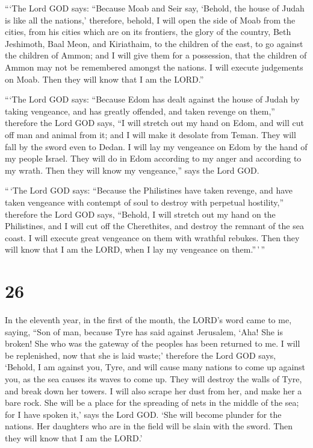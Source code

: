  ```The Lord GOD says: ``Because Moab and Seir say, `Behold,
the house of Judah is like all the nations,'  therefore,
behold, I will open the side of Moab from the cities, from his cities
which are on its frontiers, the glory of the country, Beth Jeshimoth,
Baal Meon, and Kiriathaim,  to the children of the east, to
go against the children of Ammon; and I will give them for a possession,
that the children of Ammon may not be remembered amongst the nations.
 I will execute judgements on Moab. Then they will know
that I am the LORD.''

 ```The Lord GOD says: ``Because Edom has dealt against the
house of Judah by taking vengeance, and has greatly offended, and taken
revenge on them,''  therefore the Lord GOD says, ``I will
stretch out my hand on Edom, and will cut off man and animal from it;
and I will make it desolate from Teman. They will fall by the sword even
to Dedan.  I will lay my vengeance on Edom by the hand of
my people Israel. They will do in Edom according to my anger and
according to my wrath. Then they will know my vengeance,'' says the Lord
GOD.

 ``\,`The Lord GOD says: ``Because the Philistines have
taken revenge, and have taken vengeance with contempt of soul to destroy
with perpetual hostility,''  therefore the Lord GOD says,
``Behold, I will stretch out my hand on the Philistines, and I will cut
off the Cherethites, and destroy the remnant of the sea coast.
 I will execute great vengeance on them with wrathful
rebukes. Then they will know that I am the LORD, when I lay my vengeance
on them.''\,'\,''

\hypertarget{section-24}{%
\section{26}\label{section-24}}

 In the eleventh year, in the first of the month, the LORD's
word came to me, saying,  ``Son of man, because Tyre has
said against Jerusalem, `Aha! She is broken! She who was the gateway of
the peoples has been returned to me. I will be replenished, now that she
is laid waste;'  therefore the Lord GOD says, `Behold, I am
against you, Tyre, and will cause many nations to come up against you,
as the sea causes its waves to come up.  They will destroy
the walls of Tyre, and break down her towers. I will also scrape her
dust from her, and make her a bare rock.  She will be a
place for the spreading of nets in the middle of the sea; for I have
spoken it,' says the Lord GOD. `She will become plunder for the nations.
 Her daughters who are in the field will be slain with the
sword. Then they will know that I am the LORD.'

